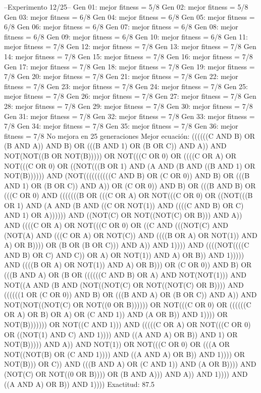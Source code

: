 --Experimento 
 12/25--
Gen 01: mejor fitness = 5/8
Gen 02: mejor fitness = 5/8
Gen 03: mejor fitness = 6/8
Gen 04: mejor fitness = 6/8
Gen 05: mejor fitness = 6/8
Gen 06: mejor fitness = 6/8
Gen 07: mejor fitness = 6/8
Gen 08: mejor fitness = 6/8
Gen 09: mejor fitness = 6/8
Gen 10: mejor fitness = 6/8
Gen 11: mejor fitness = 7/8
Gen 12: mejor fitness = 7/8
Gen 13: mejor fitness = 7/8
Gen 14: mejor fitness = 7/8
Gen 15: mejor fitness = 7/8
Gen 16: mejor fitness = 7/8
Gen 17: mejor fitness = 7/8
Gen 18: mejor fitness = 7/8
Gen 19: mejor fitness = 7/8
Gen 20: mejor fitness = 7/8
Gen 21: mejor fitness = 7/8
Gen 22: mejor fitness = 7/8
Gen 23: mejor fitness = 7/8
Gen 24: mejor fitness = 7/8
Gen 25: mejor fitness = 7/8
Gen 26: mejor fitness = 7/8
Gen 27: mejor fitness = 7/8
Gen 28: mejor fitness = 7/8
Gen 29: mejor fitness = 7/8
Gen 30: mejor fitness = 7/8
Gen 31: mejor fitness = 7/8
Gen 32: mejor fitness = 7/8
Gen 33: mejor fitness = 7/8
Gen 34: mejor fitness = 7/8
Gen 35: mejor fitness = 7/8
Gen 36: mejor fitness = 7/8
No mejora en 25 generaciones
Mejor ecuación: ((((((C AND B) OR (B AND A)) AND B) OR (((B AND 1) OR (B OR C)) AND A)) AND NOT(NOT((B OR NOT(B))))) OR NOT(((C OR 0) OR ((((C OR A) OR NOT(((C OR 0) OR ((NOT(((B OR 1) AND (A AND (B AND ((B AND 1) OR NOT(B)))))) AND (NOT((((((((((C AND B) OR (C OR 0)) AND B) OR (((B AND 1) OR (B OR C)) AND A)) OR (C OR 0)) AND B) OR (((B AND B) OR (((C OR 0) AND (((((((B OR (((C OR A) OR NOT(((C OR 0) OR ((NOT(((B OR 1) AND (A AND (B AND ((C OR NOT(1)) AND ((((C AND B) OR C) AND 1) OR A)))))) AND ((NOT(C) OR NOT((NOT(C) OR B))) AND A)) AND ((((C OR A) OR NOT(((C OR 0) OR ((C AND (((NOT(C) AND (NOT(A) AND (((C OR A) OR NOT(C)) AND ((((B OR A) OR NOT(1)) AND A) OR B)))) OR (B OR (B OR C))) AND A)) AND 1)))) AND ((((NOT((((C AND B) OR C) AND C)) OR A) OR NOT(1)) AND A) OR B)) AND 1))))) AND ((((B OR A) OR NOT(1)) AND A) OR B))) OR (C OR 0)) AND B) OR (((B AND A) OR (B OR ((((((C AND B) OR A) AND NOT(NOT(1))) AND NOT((A AND (B AND (NOT((NOT(C) OR NOT((NOT(C) OR B)))) AND ((((((1 OR (C OR 0)) AND B) OR (((B AND A) OR (B OR C)) AND A)) AND NOT(NOT((NOT(C) OR NOT((0 OR B)))))) OR NOT(((C OR 0) OR ((((((C OR A) OR B) OR A) OR (C AND 1)) AND (A OR B)) AND 1)))) OR NOT(B))))))) OR NOT((C AND 1))) AND (((((C OR A) OR NOT(((C OR 0) OR ((NOT(1) AND C) AND 1)))) AND ((A AND A) OR B)) AND 1) OR NOT(B))))) AND A)) AND NOT(1)) OR NOT(((C OR 0) OR (((A OR NOT((NOT(B) OR (C AND 1)))) AND ((A AND A) OR B)) AND 1)))) OR NOT(B))) OR C)) AND (((B AND A) OR (C AND 1)) AND (A OR B)))) AND (NOT(C) OR NOT((0 OR B)))) OR (B AND A))) AND A)) AND 1)))) AND ((A AND A) OR B)) AND 1))))
 Exactitud: 87.5%

